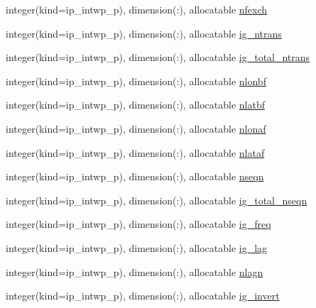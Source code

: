 \begin{DoxyCompactItemize}
\item 
integer(kind=ip\+\_\+intwp\+\_\+p), dimension(\+:), allocatable \hyperlink{namespacemod__oasis__namcouple_ac6216c78a2779e49f90a9a95a39c27d7}{nfexch}
\item 
integer(kind=ip\+\_\+intwp\+\_\+p), dimension(\+:), allocatable \hyperlink{namespacemod__oasis__namcouple_ac4549f9f5bbb37fce3edc9a208e0d48b}{ig\+\_\+ntrans}
\item 
integer(kind=ip\+\_\+intwp\+\_\+p), dimension(\+:), allocatable \hyperlink{namespacemod__oasis__namcouple_abbd7bd184bb2a3860063dbb9f109f427}{ig\+\_\+total\+\_\+ntrans}
\item 
integer(kind=ip\+\_\+intwp\+\_\+p), dimension(\+:), allocatable \hyperlink{namespacemod__oasis__namcouple_a6e774d31f16b513b1d604e72a82dff40}{nlonbf}
\item 
integer(kind=ip\+\_\+intwp\+\_\+p), dimension(\+:), allocatable \hyperlink{namespacemod__oasis__namcouple_a9b09ac96dad78313003a9436fe2f9aec}{nlatbf}
\item 
integer(kind=ip\+\_\+intwp\+\_\+p), dimension(\+:), allocatable \hyperlink{namespacemod__oasis__namcouple_ae413f2dc402b7c018e341081b8d6e208}{nlonaf}
\item 
integer(kind=ip\+\_\+intwp\+\_\+p), dimension(\+:), allocatable \hyperlink{namespacemod__oasis__namcouple_a80d81b2f026a2d0dc2de27b9ee04f7af}{nlataf}
\item 
integer(kind=ip\+\_\+intwp\+\_\+p), dimension(\+:), allocatable \hyperlink{namespacemod__oasis__namcouple_a20e9486f3e8bbdcee0de935e9be3a2e8}{nseqn}
\item 
integer(kind=ip\+\_\+intwp\+\_\+p), dimension(\+:), allocatable \hyperlink{namespacemod__oasis__namcouple_a09ed8be682296ef584f0d5777b2c6482}{ig\+\_\+total\+\_\+nseqn}
\item 
integer(kind=ip\+\_\+intwp\+\_\+p), dimension(\+:), allocatable \hyperlink{namespacemod__oasis__namcouple_affa727bb033c0f4d09962f2b4d1b4ab5}{ig\+\_\+freq}
\item 
integer(kind=ip\+\_\+intwp\+\_\+p), dimension(\+:), allocatable \hyperlink{namespacemod__oasis__namcouple_ae2c74692147a54b3f7534301d509f766}{ig\+\_\+lag}
\item 
integer(kind=ip\+\_\+intwp\+\_\+p), dimension(\+:), allocatable \hyperlink{namespacemod__oasis__namcouple_aad06af35c92de78d71671d39bcbb1690}{nlagn}
\item 
integer(kind=ip\+\_\+intwp\+\_\+p), dimension(\+:), allocatable \hyperlink{namespacemod__oasis__namcouple_a0b8948452bbd8cf1dc9f0fccc17c344d}{ig\+\_\+invert}

\end{DoxyCompactItemize}
